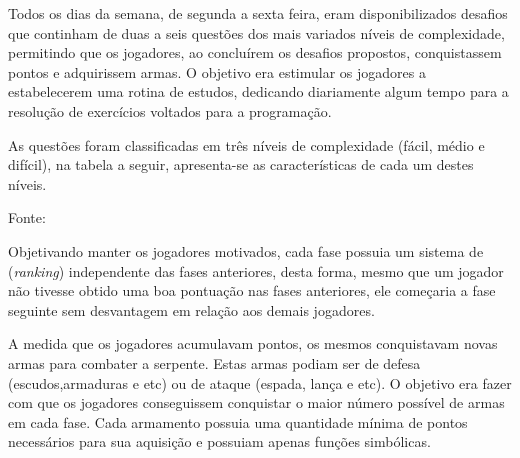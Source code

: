 \pagebreak

Todos os dias da semana, de segunda a sexta feira, eram disponibilizados desafios que continham de duas a seis
questões dos mais variados níveis de complexidade, permitindo que os jogadores, ao concluírem os desafios propostos, 
conquistassem pontos e adquirissem armas. O objetivo era estimular os jogadores a estabelecerem uma rotina de estudos,
dedicando diariamente algum tempo para a resolução de exercícios voltados para a programação.

As questões foram classificadas em três níveis de complexidade (fácil, médio e difícil), na tabela a seguir, apresenta-se
as características de cada um destes níveis.

\begin{table}[h]
	\centering
	\caption{Classificação das questões}
	Fonte: \cite{raposo2016desafio}
\end{table}

Objetivando manter os jogadores motivados, cada fase possuia um sistema de (\textit{ranking}{\itshape}) independente
das fases anteriores, desta forma, mesmo que um jogador não tivesse obtido uma boa pontuação nas fases anteriores, ele
começaria a fase seguinte sem desvantagem em relação aos demais jogadores. 

A medida que os jogadores acumulavam pontos, os mesmos conquistavam novas armas para combater a serpente. Estas armas podiam
ser de defesa (escudos,armaduras e etc) ou de ataque (espada, lança e etc). O objetivo era fazer com que os jogadores conseguissem conquistar
o maior número possível de armas em cada fase. Cada armamento possuia uma quantidade mínima de pontos necessários para sua
aquisição e possuiam apenas funções simbólicas.


